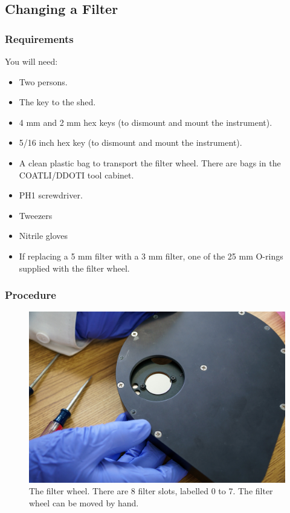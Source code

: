 \subsection{Changing a Filter}

\subsubsection{Requirements}

You will need:

\begin{itemize}
    \item Two persons.
    \item The key to the shed.
    \item 4 mm and 2 mm hex keys (to dismount and mount the instrument).
    \item 5/16 inch hex key (to dismount and mount the instrument).
    \item A clean plastic bag to transport the filter wheel. There are bags in the COATLI/DDOTI tool cabinet.
    \item PH1 screwdriver.
    \item Tweezers
    \item Nitrile gloves
    \item If replacing a 5 mm filter with a 3 mm filter, one of the 25 mm O-rings supplied with the filter wheel.
\end{itemize}

\subsubsection{Procedure}

\begin{figure}
\begin{center}
\includegraphics[width=0.8\linewidth]{figures/huitzi-filter-wheel-slots.jpg}
\end{center}
\caption{The filter wheel. There are 8 filter slots, labelled 0 to 7. The filter wheel can be moved by hand.}
\label{figure:huitzi-filter-wheel-slots}
\end{figure}

